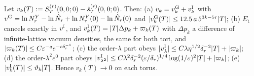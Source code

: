 \begin{theorem}\label{rot:thm:V}
Let $v_k(T):= S^{(r)}_T(0,0;0)-\hat s^{(r)}_T(0,0;0)$. Then: \textup{(a)} $v_k=v^{\rm G}_k+v^{\rm I}_k$ with $v^{\rm G}=\ln N^Y_r-\ln\hat N_r+\ln N^Y_r(0)-\ln\hat N_r(0)$ and $|v^{\rm G}_k(T)|\le12.5\,a\,5^{3k-5r}|T|$; \textup{(b)} $E_1$ cancels exactly in $v^{\rm I}$, and $v^{\rm I}_k(T)=|T|\Delta p_k+\varpi_k(T)$ with $\Delta p_k$ a difference of infinite-lattice vacuum densities, the same for both tori, and $|\varpi_k(T)|\le C\varepsilon^{-q}e^{-c\delta_r^{-1}}$; \textup{(c)} the order-$\lambda$ part obeys $|v^{\rm I}_\lambda|\le C\lambda\eta^{1/2}\delta_r^{-2}|T|+|\varpi_k|$; \textup{(d)} the order-$\lambda^2e^0$ part obeys $|v^{\rm I}_{\lambda^2}|\le C\lambda^2\delta_r^{-2}(\varepsilon/\delta_r)^{1/4}\log(1/\varepsilon)^2|T|+|\varpi_k|$; \textup{(e)} $|v^{\rm I}_k(T)|\le\vartheta_k|T|$. Hence $v_k(T)\to0$ on each torus.
\end{theorem}
